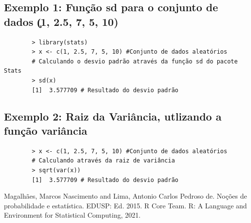 \documentclass[12pt,a4paper]{article}
\begin{document}
	\subsection*{Exemplo 1: Função sd para o conjunto de dados \c(1, 2.5, 7, 5, 10)}

	\begin{verbatim}
		> library(stats)
		> x <- c(1, 2.5, 7, 5, 10) #Conjunto de dados aleatórios
		# Calculando o desvio padrão através da função sd do pacote Stats
		> sd(x)
		[1]  3.577709 # Resultado do desvio padrão
	\end{verbatim}
	
	\subsection*{Exemplo 2: Raiz da Variância, utlizando a função variância}
	
	\begin{verbatim}
		> x <- c(1, 2.5, 7, 5, 10) #Conjunto de dados aleatórios
		# Calculando através da raiz de variância
		> sqrt(var(x))
		[1]  3.577709 # Resultado do desvio padrão
		\end{verbatim}

	
	
	\begin{thebibliography}{100}
		
		 Magalhães, Marcos Nascimento and Lima, Antonio Carlos Pedroso de. Noções de probabilidade e estatística. EDUSP: Ed. 2015.
		 R Core Team. R: A Language and Environment for Statistical Computing, 2021.
	\end{thebibliography}
	
\end{document}
